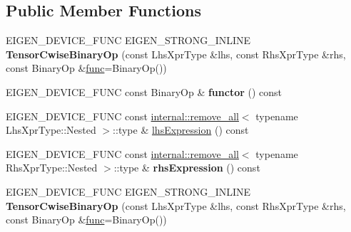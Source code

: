 \subsection*{Public Member Functions}
\begin{DoxyCompactItemize}
\item 
\mbox{\label{class_eigen_1_1_tensor_cwise_binary_op_a2416ce70c1bae33877b39acceac7ea56}} 
E\+I\+G\+E\+N\+\_\+\+D\+E\+V\+I\+C\+E\+\_\+\+F\+U\+NC E\+I\+G\+E\+N\+\_\+\+S\+T\+R\+O\+N\+G\+\_\+\+I\+N\+L\+I\+NE {\bfseries Tensor\+Cwise\+Binary\+Op} (const Lhs\+Xpr\+Type \&lhs, const Rhs\+Xpr\+Type \&rhs, const Binary\+Op \&\hyperlink{structfunc}{func}=Binary\+Op())
\item 
\mbox{\label{class_eigen_1_1_tensor_cwise_binary_op_ae85b3098030787c8993815bb5d32e1a6}} 
E\+I\+G\+E\+N\+\_\+\+D\+E\+V\+I\+C\+E\+\_\+\+F\+U\+NC const Binary\+Op \& {\bfseries functor} () const
\item 
E\+I\+G\+E\+N\+\_\+\+D\+E\+V\+I\+C\+E\+\_\+\+F\+U\+NC const \hyperlink{struct_eigen_1_1internal_1_1remove__all}{internal\+::remove\+\_\+all}$<$ typename Lhs\+Xpr\+Type\+::\+Nested $>$\+::type \& \hyperlink{class_eigen_1_1_tensor_cwise_binary_op_abe293a3a1ee663b55c0363d2fb751397}{lhs\+Expression} () const
\item 
\mbox{\label{class_eigen_1_1_tensor_cwise_binary_op_acfdb103c33af9a665974c3b65b996da2}} 
E\+I\+G\+E\+N\+\_\+\+D\+E\+V\+I\+C\+E\+\_\+\+F\+U\+NC const \hyperlink{struct_eigen_1_1internal_1_1remove__all}{internal\+::remove\+\_\+all}$<$ typename Rhs\+Xpr\+Type\+::\+Nested $>$\+::type \& {\bfseries rhs\+Expression} () const
\item 
\mbox{\label{class_eigen_1_1_tensor_cwise_binary_op_a2416ce70c1bae33877b39acceac7ea56}} 
E\+I\+G\+E\+N\+\_\+\+D\+E\+V\+I\+C\+E\+\_\+\+F\+U\+NC E\+I\+G\+E\+N\+\_\+\+S\+T\+R\+O\+N\+G\+\_\+\+I\+N\+L\+I\+NE {\bfseries Tensor\+Cwise\+Binary\+Op} (const Lhs\+Xpr\+Type \&lhs, const Rhs\+Xpr\+Type \&rhs, const Binary\+Op \&\hyperlink{structfunc}{func}=Binary\+Op())
\item 
\mbox{\label{class_eigen_1_1_tensor_cwise_binary_op_ae85b3098030787c8993815bb5d32e1a6}} 

\end{DoxyCompactItemize}
